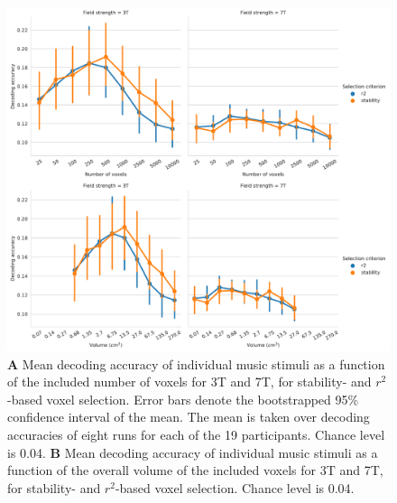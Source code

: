 \begin{figure}
  \centering
    \includegraphics[width=\linewidth]{pics/decoding_selection.pdf}

	\caption{\textbf{A} Mean decoding accuracy of individual music stimuli as a function of
  the included number of voxels for 3T and 7T, for stability- and
  $r^2$-based voxel selection. Error bars denote the bootstrapped 95\%
  confidence interval of the mean. The mean is taken over decoding
  accuracies of eight runs for each of the 19 participants. Chance level is
    0.04. \textbf{B} Mean
decoding accuracy of individual music stimuli as a function of the overall volume of the
included voxels for 3T and 7T, for stability- and $r^2$-based voxel
selection. Chance level is 0.04.
}
 \label{fig:decoding_accuracy_stimulus_selection}
\end{figure}

